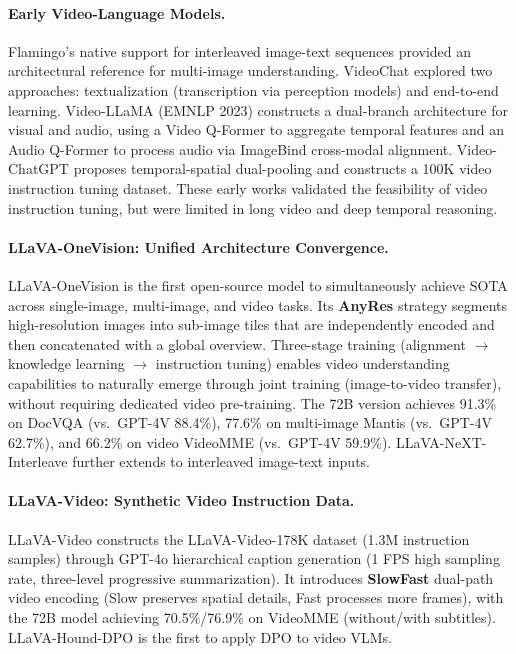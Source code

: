 \paragraph{Early Video-Language Models.}
Flamingo's native support for interleaved image-text sequences provided an architectural reference for multi-image understanding.
VideoChat \cite{li2023videochat} explored two approaches: textualization (transcription via perception models) and end-to-end learning.
Video-LLaMA \cite{zhang2023videollama} (EMNLP 2023) constructs a dual-branch architecture for visual and audio,
using a Video Q-Former to aggregate temporal features and an Audio Q-Former to process audio via ImageBind cross-modal alignment.
Video-ChatGPT \cite{maaz2023videochatgpt} proposes temporal-spatial dual-pooling
and constructs a 100K video instruction tuning dataset.
These early works validated the feasibility of video instruction tuning,
but were limited in long video and deep temporal reasoning.

\paragraph{LLaVA-OneVision: Unified Architecture Convergence.}
LLaVA-OneVision \cite{li2024llava-onevision} is the first open-source model to
simultaneously achieve SOTA across single-image, multi-image, and video tasks.
Its \textbf{AnyRes} strategy segments high-resolution images into sub-image tiles that are independently encoded and then concatenated with a global overview.
Three-stage training (alignment $\rightarrow$ knowledge learning $\rightarrow$ instruction tuning)
enables video understanding capabilities to naturally emerge through joint training (image-to-video transfer), without requiring dedicated video pre-training.
The 72B version achieves 91.3\% on DocVQA (vs.\ GPT-4V 88.4\%),
77.6\% on multi-image Mantis (vs.\ GPT-4V 62.7\%), and 66.2\% on video VideoMME (vs.\ GPT-4V 59.9\%).
LLaVA-NeXT-Interleave \cite{li2024llava-next-interleave}
further extends to interleaved image-text inputs.

\paragraph{LLaVA-Video: Synthetic Video Instruction Data.}
LLaVA-Video \cite{zhang2024llava-video} constructs the LLaVA-Video-178K dataset (1.3M instruction samples)
through GPT-4o hierarchical caption generation (1 FPS high sampling rate, three-level progressive summarization).
It introduces \textbf{SlowFast} dual-path video encoding (Slow preserves spatial details, Fast processes more frames),
with the 72B model achieving 70.5\%/76.9\% on VideoMME (without/with subtitles).
LLaVA-Hound-DPO \cite{zhang2024llava-hound} is the first to apply DPO to video VLMs.

